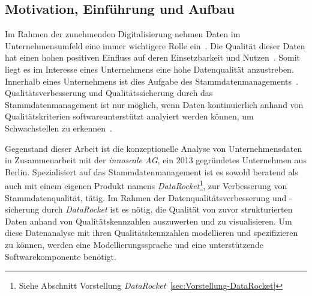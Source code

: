 \documentclass[
  language=german, %
  type=bachelor,%
  ngerman
]{isthesis}
\begin{document}
\begin{content}



  \chapter{Motivation, Einführung und Aufbau}\label{ch:einleitung}


  Im Rahmen der zunehmenden Digitalisierung nehmen Daten im Unternehmensumfeld
  eine immer wichtigere Rolle ein~\cite[][]{otto2016datenqualitat}. Die
  Qualität dieser Daten hat einen hohen positiven Einfluss auf deren
  Einsetzbarkeit und Nutzen~\cite[][]{naumann2007datenqualitat,
  helfert2000massnahmen}. Somit liegt es im Interesse eines Unternehmens eine
  hohe Datenqualität anzustreben. Innerhalb eines Unternehmens ist dies Aufgabe
  des Stammdatenmanagements~\cite[][]{legner2007stammdaten}.
  Qualitätsverbesserung und Qualitätssicherung durch das Stammdatenmanagement
  ist nur möglich, wenn Daten kontinuierlich anhand von Qualitätskriterien
  softwareunterstützt analyiert werden können, um Schwachstellen zu
  erkennen~\cite[][S. 2]{baghi2013controlling}.

  Gegenstand dieser Arbeit ist die konzeptionelle Analyse von Unternehmensdaten
  in Zusammenarbeit mit der \textit{innoscale AG}, ein 2013 gegründetes
  Unternehmen aus Berlin.  Spezialisiert auf das Stammdatenmanagement ist es
  sowohl beratend als auch mit einem eigenen Produkt namens
  \textit{DataRocket}\footnote{Siehe Abschnitt Vorstellung
  \textit{DataRocket}~\ref{sec:Vorstellung-DataRocket}}, zur Verbesserung von
  Stammdatenqualität, tätig. Im Rahmen der Datenqualitätsverbesserung und
  -sicherung durch \textit{DataRocket} ist es nötig, die Qualität von zuvor
  strukturierten Daten anhand von Qualitätskennzahlen auszuwerten und zu
  visualisieren. Um diese Datenanalyse mit ihren Qualitätskennzahlen
  modellieren und spezifizieren zu können, werden eine Modellierungssprache und
  eine unterstützende Softwarekomponente benötigt.


\end{content}
\end{document}
